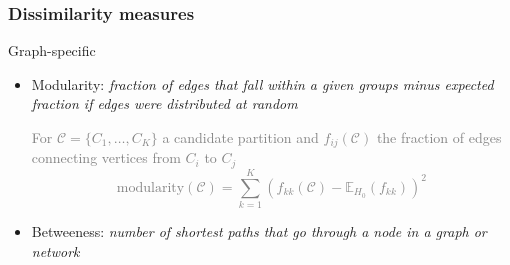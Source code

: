 \documentclass{beamer}\usepackage[]{graphicx}\usepackage[]{color}
\begin{document}
\begin{frame}
  \frametitle{Dissimilarity measures}


  \begin{block}{Graph-specific}
    \begin{itemize}
      \item \alert{Modularity}:  \textit{fraction of edges that fall within a given groups minus expected fraction if edges were distributed at random}\medskip
      

\textcolor{gray}{
For $\mathcal{C} = \{C_1,\dots,C_K\}$ a candidate partition and $f_{ij}(\mathcal{C})$ the fraction of edges connecting vertices from $C_i$ to $C_j$
\begin{equation*}
  \mathrm{modularity}(\mathcal{C}) = \sum_{k=1}^K \left(f_{kk}(\mathcal{C}) - \mathbb{E}_{H_0}(f_{kk})\right)^2
\end{equation*}
}

      \item \alert{Betweeness}: \textit{number of shortest paths that go through a node in a graph or network}
      
      \end{itemize}
  \end{block}
  
\end{frame}
\end{document}
